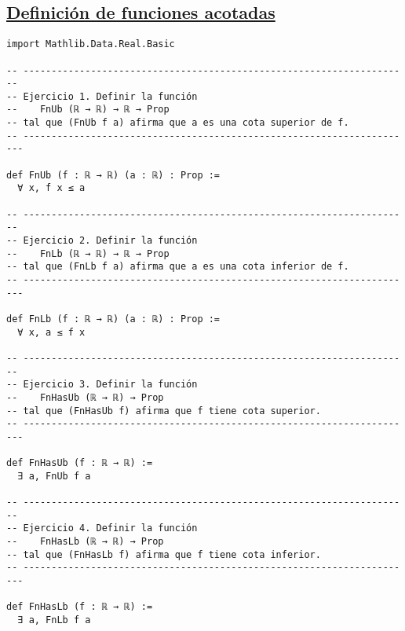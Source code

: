 \subsection{\href{./src/Logica/Definicion\_de\_funciones\_acotadas.lean}{Definición de funciones acotadas}}
\label{sec:org8ba9ea0}
\begin{verbatim}
import Mathlib.Data.Real.Basic

-- ---------------------------------------------------------------------
-- Ejercicio 1. Definir la función
--    FnUb (ℝ → ℝ) → ℝ → Prop
-- tal que (FnUb f a) afirma que a es una cota superior de f.
-- ----------------------------------------------------------------------

def FnUb (f : ℝ → ℝ) (a : ℝ) : Prop :=
  ∀ x, f x ≤ a

-- ---------------------------------------------------------------------
-- Ejercicio 2. Definir la función
--    FnLb (ℝ → ℝ) → ℝ → Prop
-- tal que (FnLb f a) afirma que a es una cota inferior de f.
-- ----------------------------------------------------------------------

def FnLb (f : ℝ → ℝ) (a : ℝ) : Prop :=
  ∀ x, a ≤ f x

-- ---------------------------------------------------------------------
-- Ejercicio 3. Definir la función
--    FnHasUb (ℝ → ℝ) → Prop
-- tal que (FnHasUb f) afirma que f tiene cota superior.
-- ----------------------------------------------------------------------

def FnHasUb (f : ℝ → ℝ) :=
  ∃ a, FnUb f a

-- ---------------------------------------------------------------------
-- Ejercicio 4. Definir la función
--    FnHasLb (ℝ → ℝ) → Prop
-- tal que (FnHasLb f) afirma que f tiene cota inferior.
-- ----------------------------------------------------------------------

def FnHasLb (f : ℝ → ℝ) :=
  ∃ a, FnLb f a
\end{verbatim}

